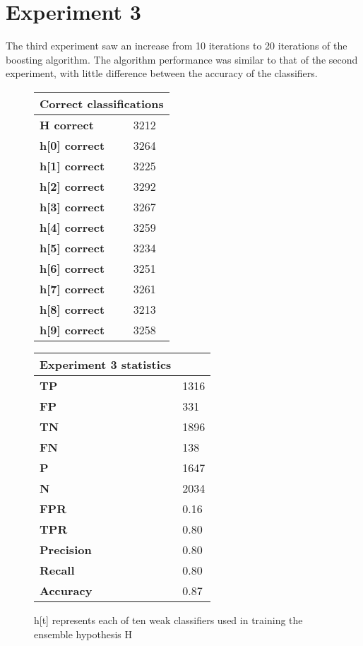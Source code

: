 \documentclass[titlepage,11pt]{article}
\begin{document}
\section[6]{Experiment 3} {

\vspace{2pt} \hspace{2pt}The third experiment saw an increase from 10 iterations to 20 iterations of the boosting algorithm. The algorithm performance was similar to that of the second experiment, with little difference between the accuracy of the classifiers.\\
\vspace{0.5pt}
\begin{figure}[h]
\begin{tabular}{|l|l|}
\hline
\multicolumn{2}{|c|}{\textbf{Correct classifications}}\\
\hline
\textbf{ H correct } & 3212 \\
\textbf{ h[0] correct } & 3264 \\
\textbf{ h[1] correct } & 3225 \\
\textbf{ h[2] correct } & 3292 \\
\textbf{ h[3] correct } & 3267 \\
\textbf{ h[4] correct } & 3259 \\
\textbf{ h[5] correct } & 3234 \\
\textbf{ h[6] correct } & 3251 \\
\textbf{ h[7] correct } & 3261 \\
\textbf{ h[8] correct } & 3213 \\
\textbf{ h[9] correct } & 3258 \\
\hline
\end{tabular}
\hspace{5pt}
\vspace{2pt}
\begin{tabular}{|l|l|}
\hline
\textbf{Experiment 3 statistics} & \\
\hline
\textbf{ TP } & 1316 \\
\textbf{ FP } & 331 \\
\textbf{ TN } & 1896 \\
\textbf{ FN } & 138 \\
\textbf{ P } &  1647 \\
\textbf{ N } & 2034 \\
\textbf{ FPR } & 0.16 \\
\textbf{ TPR } & 0.80 \\
\hline
\textbf{ Precision } & 0.80\\
\textbf{ Recall    } & 0.80\\
\textbf{ Accuracy  } & 0.87\\
\hline
\end{tabular}
\caption{h[t] represents each of ten weak classifiers used in training the ensemble hypothesis H}
\end{figure}

}
\end{document}
